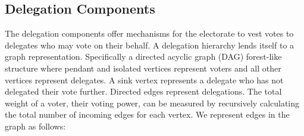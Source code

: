 \subsection{Delegation Components}
The delegation components offer mechanisms for the electorate to vest votes to
delegates who may vote on their behalf. A delegation hierarchy lends itself to a
graph representation.\cite{delegative-democracy} Specifically a directed
acyclic graph (DAG) forest-like structure where pendant and isolated vertices
represent voters and all other vertices represent delegates. A sink vertex
represents a delegate who has not delegated their vote further. Directed edges
represent delegations. The total weight of a voter, their voting power, can be
measured by recursively calculating the total number of incoming edges for each
vertex. We represent edges in the graph as follows:

